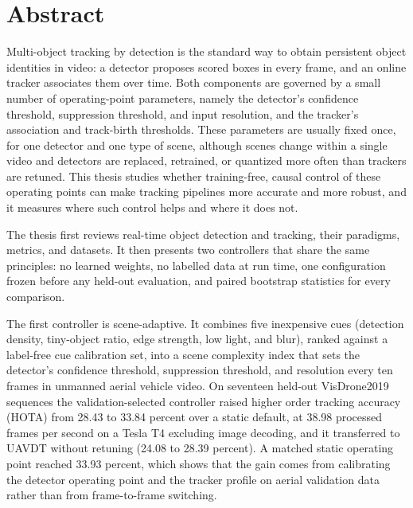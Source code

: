 \chapter*{Abstract}
\thispagestyle{plain}

Multi-object tracking by detection is the standard way to obtain persistent object identities in video: a detector proposes scored boxes in every frame, and an online tracker associates them over time. Both components are governed by a small number of operating-point parameters, namely the detector's confidence threshold, suppression threshold, and input resolution, and the tracker's association and track-birth thresholds. These parameters are usually fixed once, for one detector and one type of scene, although scenes change within a single video and detectors are replaced, retrained, or quantized more often than trackers are retuned. This thesis studies whether training-free, causal control of these operating points can make tracking pipelines more accurate and more robust, and it measures where such control helps and where it does not.

The thesis first reviews real-time object detection and tracking, their paradigms, metrics, and datasets. It then presents two controllers that share the same principles: no learned weights, no labelled data at run time, one configuration frozen before any held-out evaluation, and paired bootstrap statistics for every comparison.

The first controller is scene-adaptive. It combines five inexpensive cues (detection density, tiny-object ratio, edge strength, low light, and blur), ranked against a label-free cue calibration set, into a scene complexity index that sets the detector's confidence threshold, suppression threshold, and resolution every ten frames in unmanned aerial vehicle video. On seventeen held-out VisDrone2019 sequences the validation-selected controller raised higher order tracking accuracy (HOTA) from 28.43 to 33.84 percent over a static default, at 38.98 processed frames per second on a Tesla T4 excluding image decoding, and it transferred to UAVDT without retuning (24.08 to 28.39 percent). A matched static operating point reached 33.93 percent, which shows that the gain comes from calibrating the detector operating point and the tracker profile on aerial validation data rather than from frame-to-frame switching.

